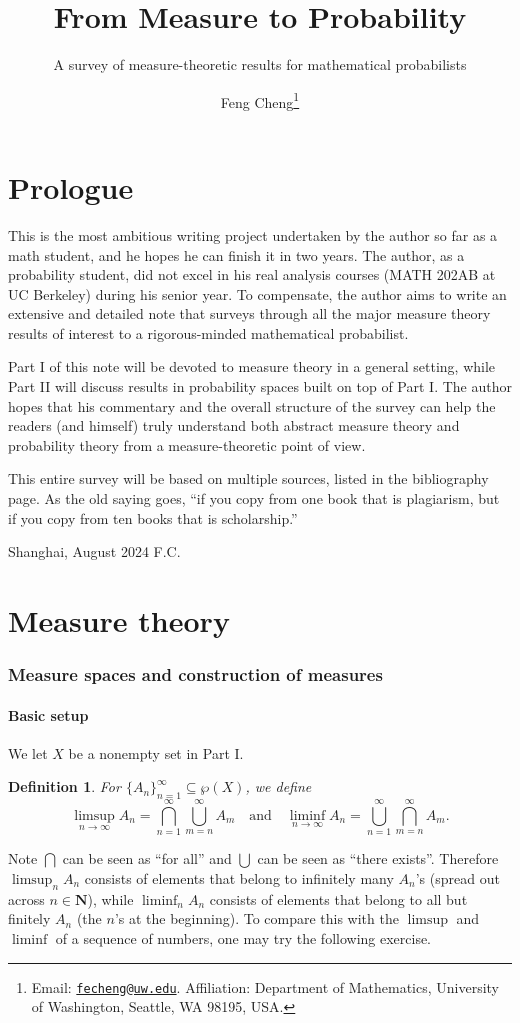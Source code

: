 \documentclass[10pt]{article}
\title{From Measure to Probability}
\subtitle{A survey of measure-theoretic results for mathematical probabilists}
\author{Feng Cheng\thanks{Email: \href{mailto:fecheng@uw.edu}{\texttt{fecheng@uw.edu}}. Affiliation: Department of Mathematics, University of Washington, Seattle, WA 98195, USA.}}
\date{}
\numberwithin{equation}{section}
\theoremstyle{plain-star}
\theoremstyle{definition-star}
\newtheorem{defn}[equation]{Definition}
\theoremstyle{remark-star}
\theoremstyle{plain-star}
\newcommand{\N}{\mathbf{N}}
\begin{document}
\maketitle

\tableofcontents
\newpage

{}
\part*{\Large Prologue}

This is the most ambitious writing project undertaken by the author so far as a math student, and he hopes he can finish it in two years. The author, as a probability student, did not excel in his real analysis courses (MATH 202AB at UC Berkeley) during his senior year. To compensate, the author aims to write an extensive and detailed note that surveys through all the major measure theory results of interest to a rigorous-minded mathematical probabilist.

Part I of this note will be devoted to measure theory in a general setting, while Part II will discuss results in probability spaces built on top of Part I. The author hopes that his commentary and the overall structure of the survey can help the readers (and himself) truly understand both abstract measure theory and probability theory from a measure-theoretic point of view.

This entire survey will be based on multiple sources, listed in the bibliography page. As the old saying goes, ``if you copy from one book that is plagiarism, but if you copy from ten books that is scholarship.''
\vspace{1\baselineskip}

\noindent Shanghai, August 2024 \hfill F.C.
\newpage

\part{Measure theory}
\section{Measure spaces and construction of measures}
\subsection{Basic setup}
We let $X$ be a nonempty set in Part I.
\begin{defn}
    For $\{A_n\}_{n=1}^\infty\subseteq \wp(X)$, we define \[
        \limsup_{n \to \infty} A_n = \bigcap_{n=1}^\infty \bigcup_{m=n}^\infty A_m \quad \text{and}\quad \liminf_{n \to \infty} A_n = \bigcup_{n = 1}^\infty \bigcap_{m = n}^\infty A_m.
    \]
\end{defn}
Note $\bigcap$ can be seen as ``for all'' and $\bigcup$ can be seen as ``there exists''. Therefore $\limsup_n A_n$ consists of elements that belong to infinitely many $A_n$'s (spread out across $n \in \N$), while $\liminf_n A_n$ consists of elements that belong to all but finitely $A_n$ (the $n$'s at the beginning). To compare this with the $\limsup$ and $\liminf$ of a sequence of numbers, one may try the following exercise.
\end{document}
